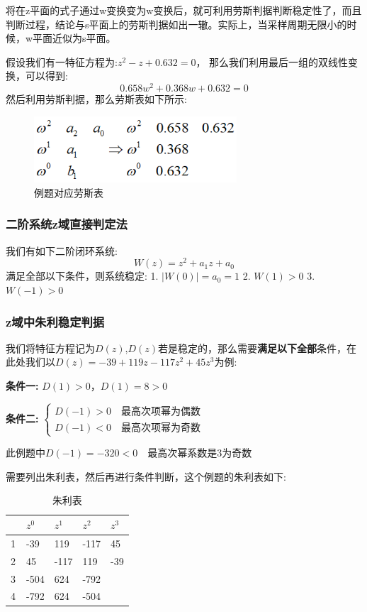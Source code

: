 \documentclass[12pt, a4paper, oneside]{ctexbook}
\begin{document}
将在z平面的式子通过w变换变为w变换后，就可利用劳斯判据判断稳定性了，而且判断过程，结论与s平面上的劳斯判据如出一辙。实际上，当采样周期无限小的时候，w平面近似为s平面。

假设我们有一特征方程为:$z^2-z+0.632=0$，
那么我们利用最后一组的双线性变换，可以得到:
$$0.658w^2+0.368w+0.632=0$$
然后利用劳斯判据，那么劳斯表如下所示:
\begin{figure}[htbp]
	\centering
	\includegraphics[width=7.56cm,height=2.48cm]{img/3_1.png}
	\caption{例题对应劳斯表}
\end{figure}

\subsubsection{二阶系统z域直接判定法} 
\noindent 我们有如下二阶闭环系统:
$$
W(z)=z^2+a_1z+a_0
$$
满足全部以下条件，则系统稳定:
1. $|W(0)|=a_0=1$
2. $W(1)>0$
3. $W(-1)>0$

\subsubsection{z域中朱利稳定判据} 
我们将特征方程记为$D(z)$,$D(z)$若是稳定的，那么需要\textbf{满足以下全部}条件，在此处我们以$D(z)=-39+119z-117z^2+45z^3$为例:

\noindent \textbf{条件一:} $D(1)>0$，$D(1)=8>0$

\noindent \textbf{条件二:} $\left\{  
\begin{array}{lr}  
	D(-1) > 0 \quad \mbox{最高次项幂为偶数}   \\  
	D(-1) < 0 \quad \mbox{最高次项幂为奇数}
\end{array}  
\right.
$

\noindent 此例题中$D(-1)=-320<0 \quad \mbox{最高次幂系数是3为奇数}$

\noindent 需要列出朱利表，然后再进行条件判断，这个例题的朱利表如下:
\begin{table}[!ht]
	\centering
	\caption{朱利表}
	\begin{tabular}{|l|l|l|l|l|}
		\hline
		~ & $z^{0}$ & $z^{1}$ & $z^{2}$ & $z^{3}$ \\ \hline
		1 & -39 & 119 & -117 & 45 \\ \hline
		2 & 45 & -117 & 119 & -39 \\ \hline
		3 & -504 & 624 & -792 & ~ \\ \hline
		4 & -792 & 624 & -504 & ~ \\ \hline
	\end{tabular}
\end{table}
\end{document}
